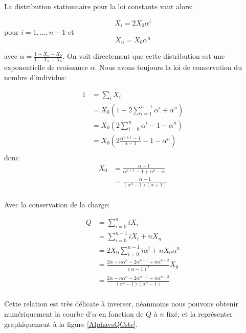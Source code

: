 La distribution stationnaire pour la loi constante vaut alors:

\begin{equation}
X_i=2 X_0 \alpha^i
\end{equation}
pour $i=1,...,n-1$ et 
\begin{equation}
X_n= X_0 \alpha^n
\end{equation}

avec $\alpha = \frac{1+X_n-X_0}{1-X_n+X_0}$.
On voit directement que cette distribution est une exponentielle de croissance $\alpha$. Nous avons toujours la loi de conservation du nombre d'individus:

\begin{equation}
\begin{aligned}
1&= \sum_i X_i\\
	&= X_0 (1+2\sum_{i=1}^{n-1}\alpha^i+\alpha^n)\\
	&= X_0 (2\sum_{i=0}^{n}\alpha^i-1-\alpha^n)\\
	&= X_0 (2 \frac{\alpha^{n+1}-1}{\alpha-1}-1-\alpha^n)\\
\end{aligned}
\end{equation}
donc
\begin{equation}
\begin{aligned}
X_0	&= \frac{\alpha-1}{\alpha^{n+1}-1+\alpha^n-\alpha}\\
	&= \frac{\alpha-1}{(\alpha^{n}-1)(\alpha+1)}\\
\end{aligned}
\end{equation}

Avec la conservation de la charge:

\begin{equation}
\begin{aligned}
Q	&= \sum_{i=0}^n i X_i\\
	&= \sum_{i=0}^{n-1} i X_i + n X_n\\
	&= 2 X_0 \sum_{i=0}^{n-1} i \alpha^i + n X_0 \alpha^n\\
	&= \frac{2\alpha -n\alpha^n-2\alpha^{n+1}+n\alpha^{n+2}}{(\alpha-1)^2}X_0\\
	&= \frac{2\alpha -n\alpha^n-2\alpha^{n+1}+n\alpha^{n+2}}{(\alpha^2-1)(\alpha^{n}-1)}\\
\end{aligned}
\end{equation}

Cette relation est très délicate à inverser, néanmoins nous pouvons obtenir numériquement la courbe d'$\alpha$ en fonction de $Q$ à $n$ fixé, et la représenter graphiquement à la figure \ref{AlphavsQCste}.\\

